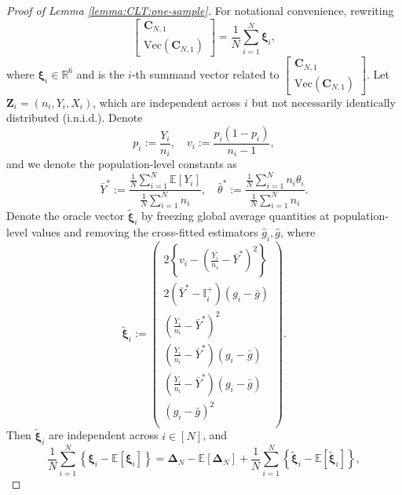 \documentclass[12pt,letterpaper]{article}
\begin{document}
\begin{proof}[Proof of Lemma \ref{lemma:CLT:one-sample}]
For notational convenience, rewriting
\begin{equation}\label{eq:C:vector}
\begin{bmatrix}
\mathbf{C}_{N,1}\\
\mathrm{Vec}(\mathbf{C}_{N,1})
\end{bmatrix}=\frac{1}{N}\sum_{i=1}^N\boldsymbol{\xi}_i,
\end{equation}
where $\boldsymbol{\xi}_i\in\mathbb{R}^6$ and is the $i$-th summand vector related to $\begin{bmatrix}
\mathbf{C}_{N,1}\\
\mathrm{Vec}(\mathbf{C}_{N,1})
\end{bmatrix}$. Let $\mathbf{Z}_i=(n_i,Y_i,X_i)$, which are independent across $i$ but not necessarily identically distributed (i.n.i.d.). Denote 
$$p_i:=\frac{Y_i}{n_i},\quad v_i:=\frac{p_i(1-p_i)}{n_i-1},$$
and we denote the population-level constants as 
$$\bar{Y}^*:=\frac{\frac{1}{N}\sum_{i=1}^N\mathbb{E}[Y_i]}{\frac{1}{N}\sum_{i=1}^Nn_i},\quad  \bar{\theta}^*:=\frac{\frac{1}{N}\sum_{i=1}^Nn_i\theta_i}{\frac{1}{N}\sum_{i=1}^Nn_i}.$$
Denote the oracle vector $\tilde{\boldsymbol{\xi}}_i$ by freezing global average quantities at population-level values and removing the cross-fitted estimators $\hat{g}_i, \hat{g}$, where 
\begin{equation}\label{eq:xi:oracle}
\tilde{\boldsymbol{\xi}}_i:=\begin{pmatrix}
\displaystyle2\left\{v_i-\left(\frac{Y_i}{n_i}-\bar{Y}^*\right)^2\right\}\\
\displaystyle2\left(\bar{Y}^*-\mathbb{I}_i^{+}\right)\left(g_i-\bar{g}\right)\\
\displaystyle\left(\frac{Y_i}{n_i}-\bar{Y}^*\right)^2\\
\displaystyle\left(\frac{Y_i}{n_i}-\bar{Y}^*\right)(g_i-\bar{g})\\
\displaystyle\left(\frac{Y_i}{n_i}-\bar{Y}^*\right)(g_i-\bar{g})\\
\displaystyle(g_i-\bar{g})^2\\
\end{pmatrix}.
\end{equation}
Then $\tilde{\boldsymbol{\xi}}_i$ are independent across $i\in[N]$, and 
\begin{equation}\label{eq:CLT:one-sampl:decompose}
\frac{1}{N}\sum_{i=1}^N\left\{\boldsymbol{\xi}_i-\mathbb{E}[\boldsymbol{\xi}_i]\right\}=\mathbf{\Delta}_N-\mathbb{E}[\mathbf{\Delta}_N]+\frac{1}{N}\sum_{i=1}^N\left\{\tilde{\boldsymbol{\xi}}_i-\mathbb{E}[\tilde{\boldsymbol{\xi}}_i]\right\},

\end{equation}
\end{proof}
\end{document}

